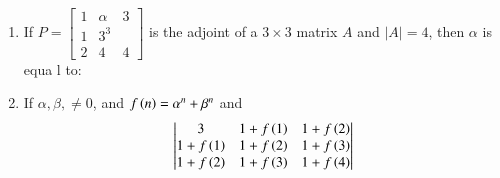 \documentclass[journal,12pt,twocolumn]{IEEEtran}
\theoremstyle{remark}
\begin{document}
\begin{enumerate}
 	\item If $P = \begin{bmatrix}1&\alpha&3\\1&3^3\\2&4&4\end{bmatrix}$ is the adjoint of a $3\times3$ matrix $A$ and $|A| = 4$, then $\alpha$ is equa l to:
	\hfill{}
        \begin{enumerate}[label={(\alph*)}]
        \end{enumerate}

	\item If $\alpha,\beta,\neq 0$, and $f\left(n\right) = \alpha^n + \beta^n$ and
		\newline
		\begin{align*}
			\begin{vmatrix}
				3 & 1+f\left(1\right) & 1+f\left(2\right)\\
				1+f\left(1\right) & 1+f\left(2\right) & 1+f\left(3\right)\\
				1+f\left(2\right) & 1+f\left(3\right) & 1+f\left(4\right)
			\end{vmatrix}
		\end{align*}

	\hfill{}
        \begin{enumerate}[label={(\alph*)}]
        \end{enumerate}

\end{enumerate}
\end{document}
